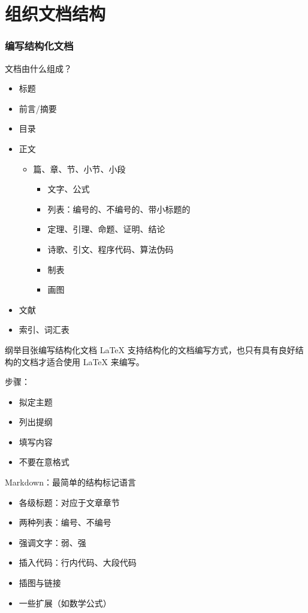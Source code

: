 \part{组织文档结构}

\section{编写结构化文档}

\begin{frame}{文档由什么组成？}
\begin{itemize}
\item 标题
\item 前言/摘要
\item 目录
\item 正文
\begin{itemize}
\item 篇、章、节、小节、小段
\begin{itemize}
\item 文字、公式
\item 列表：编号的、不编号的、带小标题的
\item 定理、引理、命题、证明、结论
\item 诗歌、引文、程序代码、算法伪码
\item 制表
\item 画图
\end{itemize}
\end{itemize}
\item 文献
\item 索引、词汇表
\end{itemize}
\end{frame}

\begin{frame}{纲举目张}{编写结构化文档}
\LaTeX{} 支持结构化的文档编写方式，也只有具有良好结构的文档才适合使用 \LaTeX{} 来编写。\pause

步骤：
\begin{itemize}
\item 拟定主题
\item 列出提纲
\item 填写内容
\item {}\alert{不要在意格式}
\end{itemize}
\end{frame}

\begin{frame}{Markdown：最简单的结构标记语言}
\begin{itemize}
\item 各级标题：对应于文章章节

\item 两种列表：编号、不编号

\item 强调文字：弱、强

\item 插入代码：行内代码、大段代码

\item 插图与链接

\item 一些扩展（如数学公式）
\end{itemize}
\end{frame}

